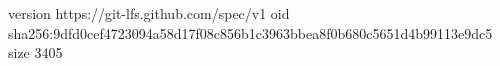 version https://git-lfs.github.com/spec/v1
oid sha256:9dfd0cef4723094a58d17f08c856b1c3963bbea8f0b680c5651d4b99113e9dc5
size 3405
